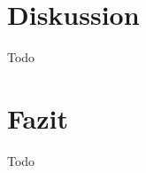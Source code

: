 \documentclass[twoside,twocolumn]{article}
\begin{document}

\section{Diskussion}

Todo


\section{Fazit}

Todo


\renewcommand{\refname}{Quellenverzeichnis}




\end{document}
